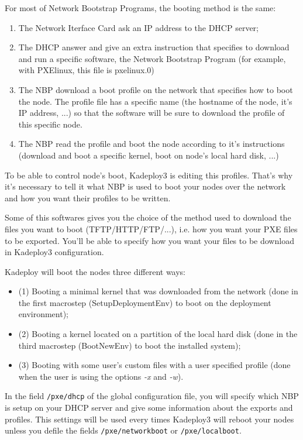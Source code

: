 \documentclass[a4wide,10pt,oneside]{book}
\newcommand{\ypath}[1]{\texttt{#1}}
\begin{document}
For most of Network Bootstrap Programs, the booting method is the same:
\begin{enumerate}
  \item The Network Iterface Card ask an IP address to the DHCP server;
  \item The DHCP answer and give an extra instruction that specifies to download and run a specific software, the Network Bootstrap Program (for example, with PXElinux, this file is pxelinux.0)
  \item The NBP download a boot profile on the network that specifies how to boot the node. The profile file has a specific name (the hostname of the node, it's IP address, ...) so that the software will be sure to download the profile of this specific node.
  \item The NBP read the profile and boot the node according to it's instructions (download and boot a specific kernel, boot on node's local hard disk, ...)
\end{enumerate}

To be able to control node's boot, Kadeploy3 is editing this profiles. That's why it's necessary to tell it what NBP is used to boot your nodes over the network and how you want their profiles to be written.

Some of this softwares gives you the choice of the method used to download the files you want to boot (TFTP/HTTP/FTP/...), i.e. how you want your PXE files to be exported. You'll be able to specify how you want your files to be download in Kadeploy3 configuration.

Kadeploy will boot the nodes three different ways:
\begin{itemize}
  \item (1) Booting a minimal kernel that was downloaded from the network (done in the first macrostep (SetupDeploymentEnv) to boot on the deployment environment);
  \item (2) Booting a kernel located on a partition of the local hard disk (done in the third macrostep (BootNewEnv) to boot the installed system);
  \item (3) Booting with some user's custom files with a user specified profile (done when the user is using the options \emph{-x} and \emph{-w}).
\end{itemize}

In the field \ypath{/pxe/dhcp} of the global configuration file, you will specify which NBP is setup on your DHCP server and give some information about the exports and profiles. This settings will be used every times Kadeploy3 will reboot your nodes unless you defile the fields \ypath{/pxe/networkboot} or \ypath{/pxe/localboot}.
\end{document}
